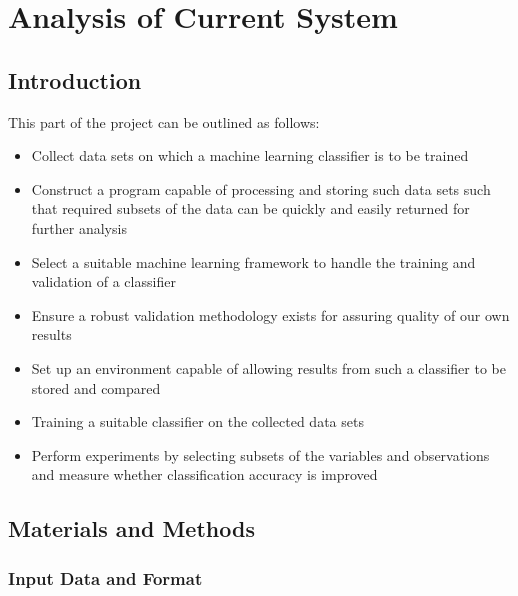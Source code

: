 \chapter{Analysis of Current System}
\ifpdf
    \graphicspath{{Chapter2/Figs/Raster/}{Chapter2/Figs/PDF/}{Chapter2/Figs/}}
\else
    \graphicspath{{Chapter2/Figs/Vector/}{Chapter2/Figs/}}
\fi

\section{Introduction}

This part of the project can be outlined as follows:

\begin{itemize}
    \item Collect data sets on which a machine learning classifier is to be trained
    \item Construct a program capable of processing and storing such data sets
        such that required subsets of the data can be quickly and easily
        returned for further analysis
    \item Select a suitable machine learning framework to handle the training
        and validation of a classifier
    \item Ensure a robust validation methodology exists for assuring quality of
        our own results
    \item Set up an environment capable of allowing results from such a
        classifier to be stored and compared
    \item Training a suitable classifier on the collected data sets
    \item Perform experiments by selecting subsets of the variables and
        observations and measure whether classification accuracy is improved
\end{itemize}

\section{Materials and Methods}
\subsection{Input Data and Format}

